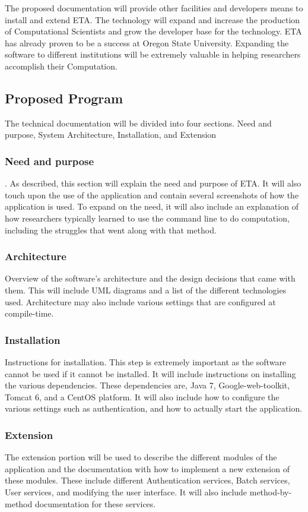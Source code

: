 \documentclass[a4paper,12pt]{texMemo}
\begin{document}
The proposed documentation will provide other facilities and developers means to install and extend ETA. The technology will expand and increase the production of  Computational Scientists and grow the developer base for the technology. ETA has already proven to be a success at Oregon State University. Expanding the software to different institutions will be extremely valuable in helping researchers accomplish their Computation.

\subsection*{Proposed Program}

The technical documentation will be divided into four sections. Need and purpose,  System Architecture, Installation, and Extension
\subsubsection*{Need and purpose}. As described, this section will explain the need and purpose of ETA. It will also touch upon the use of the application and contain several screenshots of how the application is used. To expand on the need, it will also include an explanation of how researchers typically learned to use the command line to do computation, including the struggles that went along with that method.
\subsubsection*{Architecture}
Overview of the software's architecture and the design decisions that came with them. This will include UML diagrams and a list of the different technologies used. Architecture may also include various settings that are configured at compile-time.

\subsubsection*{Installation}
Instructions for installation. This step is extremely important as the software cannot be used if it cannot be installed. It will include instructions on installing the various dependencies. These dependencies are, Java 7, Google-web-toolkit, Tomcat 6, and a CentOS platform. It will also include how to configure the various settings such as authentication, and how to actually start the application.

\subsubsection*{Extension}
The extension portion will be used to describe the different modules of the application and the documentation with how to implement a new extension of these modules. These include different Authentication services, Batch services, User services, and modifying the user interface. It will also include method-by-method documentation for these services.
\end{document}

